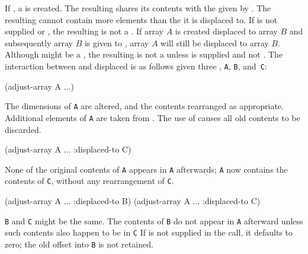 If 
, a 
is created. The resulting  shares its contents with the  given by
.
The resulting  cannot contain more elements than the 
it is displaced to.  
If  is not supplied or \nil,
the resulting  is not a .
If array $A$ is created displaced to array $B$ and subsequently
array $B$ is given to , array $A$ will still be
displaced to array $B$.
Although  might be a , 
the resulting  is not a  unless
 is supplied and not \nil.
The interaction between  and 
displaced  
is as follows given three , {\tt A}, {\tt B}, and~{\tt C}:

\beginlist
{}

\code
 (adjust-array A ...)
\endcode

The dimensions of {\tt A} are altered, and the
contents rearranged as appropriate.  
Additional elements of {\tt A} are taken from
.  
The use of  causes all old contents to be
discarded.


\code
 (adjust-array A ... :displaced-to C)
\endcode
               
None of the original contents of {\tt A} appears in 
{\tt A} afterwards; {\tt A} now contains
the contents of {\tt C}, without any rearrangement of {\tt C}.


\code
 (adjust-array A ... :displaced-to B)
 (adjust-array A ... :displaced-to C)
\endcode

{\tt B} and {\tt C} might be the same. The contents of {\tt B} do not appear in 
{\tt A} afterward unless such contents also happen to be in {\tt C}  If
is not supplied in the  call, it defaults
to zero; the old offset into {\tt B} is not retained.
                                  

